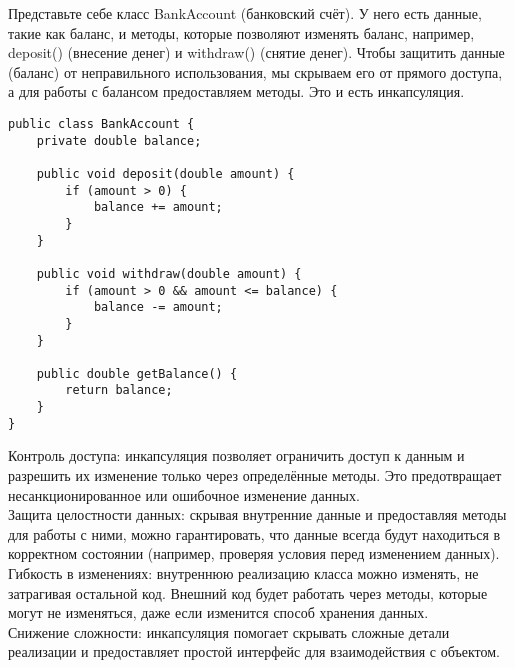 Представьте себе класс BankAccount (банковский счёт). У него есть данные, такие как баланс, и методы, которые позволяют изменять баланс, например, deposit() (внесение денег) и withdraw() (снятие денег). Чтобы защитить данные (баланс) от неправильного использования, мы скрываем его от прямого доступа, а для работы с балансом предоставляем методы. Это и есть инкапсуляция.
\begin{lstlisting}
public class BankAccount {
    private double balance;

    public void deposit(double amount) {
        if (amount > 0) {
            balance += amount;
        }
    }

    public void withdraw(double amount) {
        if (amount > 0 && amount <= balance) {
            balance -= amount;
        }
    }

    public double getBalance() {
        return balance;
    }
}

\end{lstlisting}
Контроль доступа:  инкапсуляция позволяет ограничить доступ к данным и разрешить их изменение только через определённые методы. Это предотвращает несанкционированное или ошибочное изменение данных. \\
Защита целостности данных: скрывая внутренние данные и предоставляя методы для работы с ними, можно гарантировать, что данные всегда будут находиться в корректном состоянии (например, проверяя условия перед изменением данных). \\
Гибкость в изменениях: внутреннюю реализацию класса можно изменять, не затрагивая остальной код. Внешний код будет работать через методы, которые могут не изменяться, даже если изменится способ хранения данных. \\
Снижение сложности: инкапсуляция помогает скрывать сложные детали реализации и предоставляет простой интерфейс для взаимодействия с объектом. \\
